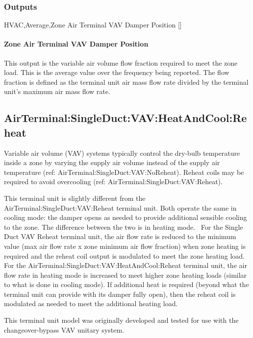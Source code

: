 \subsubsection{Outputs}\label{outputs-3}

HVAC,Average,Zone Air Terminal VAV Damper Position {[]}

\paragraph{Zone Air Terminal VAV Damper Position}\label{zone-air-terminal-vav-damper-position-1}

This output is the variable air volume flow fraction required to meet the zone load. This is the average value over the frequency being reported. The flow fraction is defined as the terminal unit air mass flow rate divided by the terminal unit's maximum air mass flow rate.

\subsection{AirTerminal:SingleDuct:VAV:HeatAndCool:Reheat}\label{airterminalsingleductvavheatandcoolreheat}

Variable air volume (VAV) systems typically control the dry-bulb temperature inside a zone by varying the supply air volume instead of the supply air temperature (ref: AirTerminal:SingleDuct:VAV:NoReheat). Reheat coils may be required to avoid overcooling (ref: AirTerminal:SingleDuct:VAV:Reheat).

This terminal unit is slightly different from the AirTerminal:SingleDuct:VAV:Reheat terminal unit. Both operate the same in cooling mode: the damper opens as needed to provide additional sensible cooling to the zone. The difference between the two is in heating mode.~ For the Single Duct VAV Reheat terminal unit, the air flow rate is reduced to the minimum value (max air flow rate x zone minimum air flow fraction) when zone heating is required and the reheat coil output is modulated to meet the zone heating load.~ For the AirTerminal:SingleDuct:VAV:HeatAndCool:Reheat terminal unit, the air flow rate in heating mode is increased to meet higher zone heating loads (similar to what is done in cooling mode). If additional heat is required (beyond what the terminal unit can provide with its damper fully open), then the reheat coil is modulated as needed to meet the additional heating load.

This terminal unit model was originally developed and tested for use with the changeover-bypass VAV unitary system.

